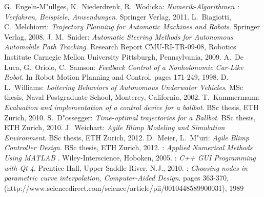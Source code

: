 
\begin{thebibliography}{99}



 {\sc G.~Engeln-M"ullges, K.~Niederdrenk, R.~Wodicka}:
{\it Numerik-Algorithmen : Verfahren, Beispiele, Anwendungen}. Springer Verlag, 2011.
 {\sc L.~Biagiotti, C.~Melchiorri}:
{\it Trajectory Planning for Automatic Machines and Robots}. Springer Verlag, 2008.
 {\sc J. M.~Snider}:
{\it Automatic Steering Methods for Autonomous Automobile Path Tracking}. Research Report CMU-RI-TR-09-08, Robotics Institute Carnegie Mellon University Pittsburgh, Pennsylvania, 2009.
 {\sc A.~De Luca, G.~Oriolo, C.~Samson}:
{\it Feedback Control of a Nonholonomic Car-Like Robot}. In Robot Motion Planning and Control, pages 171-249, 1998.
 {\sc D. L.~Williams}:
{\it Loitering Behaviors of Autonomous Underwater Vehicles}. MSc thesis, Naval Postgraduate School, Monterey, California, 2002.
 {\sc T.~Kammermann}:
{\it Evaluation and implementation of a control device for a ballbot}. BSc thesis, ETH Zurich, 2010.
 {\sc S.~D"ossegger}:
{\it Time-optimal trajectories for a Ballbot}. BSc thesis, ETH Zurich, 2010.
 {\sc J.~Weichart}:
{\it Agile Blimp Modeling and Simulation Environment}. BSc thesis, ETH Zurich, 2012.
 {\sc D.~Meier, L.~M"uri}:
{\it Agile Blimp Controller Design}. BSc thesis, ETH Zurich, 2012.
:
{\it Applied Numerical Methods Using MATLAB} . Wiley-Interscience, Hoboken, 2005.
:
{\it C++ GUI Programming with Qt 4}. Prentice Hall, Upper Saddle River, N.J., 2010.
:
{\it Choosing nodes in parametric curve interpolation, Computer-Aided Design}. pages 363-370, (http://www.sciencedirect.com/science/article/pii/0010448589900031), 1989



\end{thebibliography}
